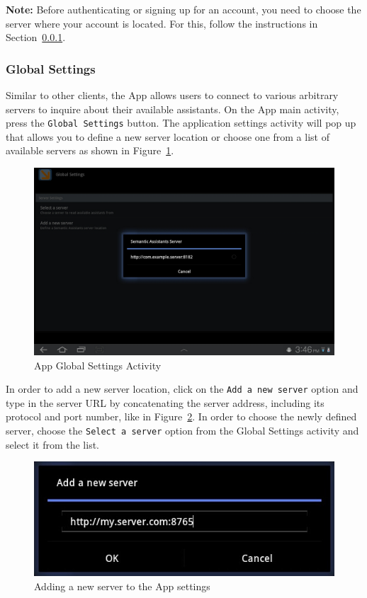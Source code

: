\blankline
\noindent
\textbf{Note:} Before authenticating or signing up for an account, you need to choose the \sa server where your account is located. For this, follow the instructions in Section~\ref{sec:android_global_settings}.

\subsubsection{Global Settings}
\label{sec:android_global_settings}
Similar to other \sa clients, the \sa App allows users to connect to various arbitrary servers to inquire about their available assistants. On the \sa App main activity, press the \texttt{Global Settings} button. The application settings activity will pop up that allows you to define a new server location or choose one from a list of available servers as shown in Figure~\ref{fig:android_global_settings}.

\begin{figure}[htb]
\centering
\includegraphics[scale=0.35]{pictures/android_global_settings.jpg}
\caption{\sa App Global Settings Activity}
\label{fig:android_global_settings}
\end{figure}

In order to add a new server location, click on the \texttt{Add a new server} option and type in the server URL by concatenating the server address, including its protocol and port number, like in Figure~\ref{fig:android_new_server}. In order to choose the newly defined server, choose the \texttt{Select a server} option from the Global Settings activity and select it from the list.

\begin{figure}[htb]
\centering
\includegraphics[scale=0.5]{pictures/android_new_server.jpg}
\caption{Adding a new server to the \sa App settings}
\label{fig:android_new_server}
\end{figure}

